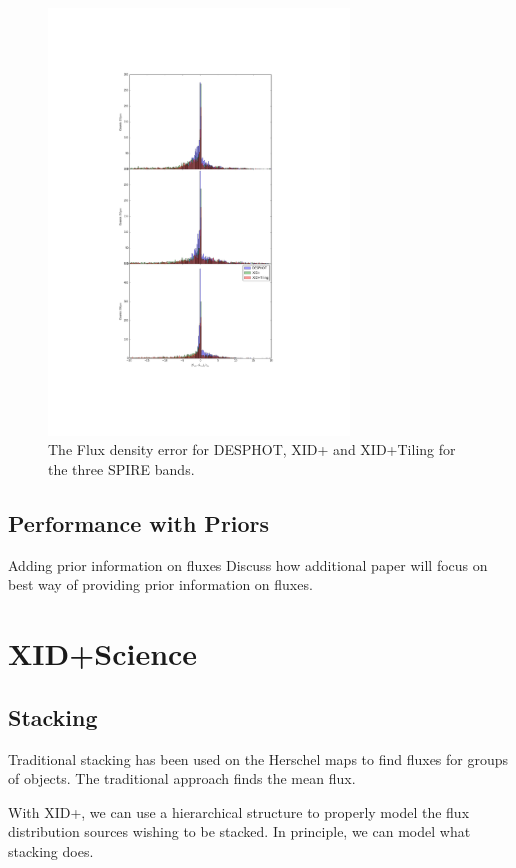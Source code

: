 \documentclass[useAMS,usenatbib]{mn2e}
\begin{document}
\begin{figure}
\includegraphics[width=8cm]{./Figures/Flux_density_error}
\caption{The Flux density error for DESPHOT, XID+ and XID+Tiling for the three SPIRE bands.}\label{Fig:flux_density_error}
\end{figure}

\subsection{Performance with Priors}
Adding prior information on fluxes 
Discuss how additional paper will focus on best way of providing prior information on fluxes.


\section{XID+Science}
\subsection{Stacking}
Traditional stacking has been used on the Herschel maps to find fluxes for groups of objects. The traditional approach finds the mean flux.

With XID+, we can use a hierarchical structure to properly model the flux distribution sources wishing to be stacked. In principle, we can model what stacking does. 
\end{document}
